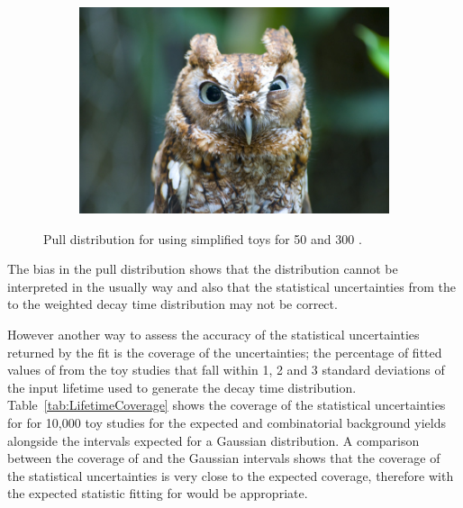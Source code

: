{\begin{figure}[htbp]
\begin{subfigure}[b]{0.48\textwidth}
       \includegraphics[width=\textwidth]{./Figs/placeholder.jpeg}
   \end{subfigure}
    \caption{Pull distribution for \tmumu using simplified toys for 50 and 300 \fb.}
    \label{fig:morestatstaupulls}
\end{figure}


The bias in the \tmumu pull distribution shows that the distribution cannot be interpreted in the usually way and also that the statistical uncertainties from the \ml to the weighted decay time distribution may not be correct. 

However another way to assess the accuracy of the statistical uncertainties returned by the \ml fit is the coverage of the uncertainties; the percentage of fitted values of \tmumu from the toy studies that fall within 1, 2 and 3 standard deviations of the input lifetime used to generate the \bsmumu decay time distribution. Table~\ref{tab:LifetimeCoverage} shows the coverage of the statistical uncertainties for \tmumu for 10,000 toy studies for the expected \bsmumu and combinatorial background yields alongside the intervals expected for a Gaussian distribution. A comparison between the coverage of \tmumu and the Gaussian intervals shows that the coverage of the statistical uncertainties is very close to the expected coverage, therefore with the expected statistic fitting for \tmumu would be appropriate.

}
